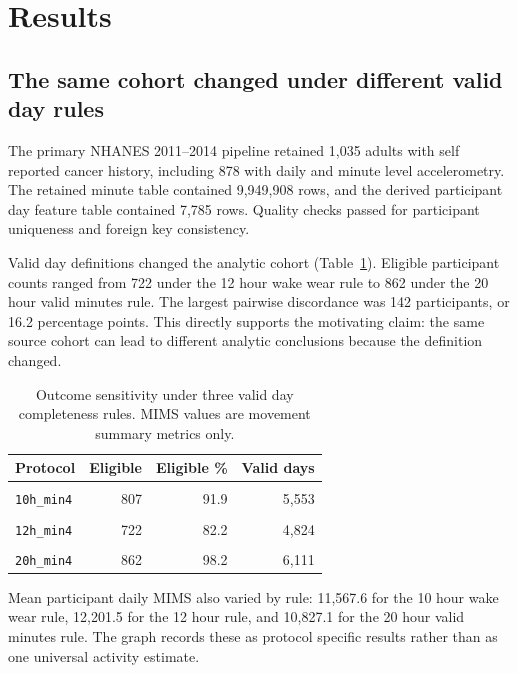 \documentclass[final,5p,times,twocolumn]{elsarticle}
\begin{document}
\section{Results}
\label{sec:results}

\subsection{The same cohort changed under different valid day rules}

The primary NHANES 2011--2014 pipeline retained 1,035 adults with self reported cancer history, including 878 with daily and minute level accelerometry. The retained minute table contained 9,949,908 rows, and the derived participant day feature table contained 7,785 rows. Quality checks passed for participant uniqueness and foreign key consistency.

Valid day definitions changed the analytic cohort (Table~\ref{tab:sensitivity}). Eligible participant counts ranged from 722 under the 12 hour wake wear rule to 862 under the 20 hour valid minutes rule. The largest pairwise discordance was 142 participants, or 16.2 percentage points. This directly supports the motivating claim: the same source cohort can lead to different analytic conclusions because the definition changed.

\begin{table}[t]
\caption{Outcome sensitivity under three valid day completeness rules. MIMS values are movement summary metrics only.}
\label{tab:sensitivity}
\centering
\scriptsize
\begin{tabularx}{\columnwidth}{>{\raggedright\arraybackslash}p{}rrr}
\toprule
Protocol & Eligible & Eligible \% & Valid days \\
\midrule
\shortstack[l]{\texttt{wake\_wear}\\\texttt{10h\_min4}} & 807 & 91.9 & 5,553 \\
\shortstack[l]{\texttt{wake\_wear}\\\texttt{12h\_min4}} & 722 & 82.2 & 4,824 \\
\shortstack[l]{\texttt{valid\_minutes}\\\texttt{20h\_min4}} & 862 & 98.2 & 6,111 \\
\bottomrule
\end{tabularx}
\end{table}

Mean participant daily MIMS also varied by rule: 11,567.6 for the 10 hour wake wear rule, 12,201.5 for the 12 hour rule, and 10,827.1 for the 20 hour valid minutes rule. The graph records these as protocol specific results rather than as one universal activity estimate.
\end{document}
